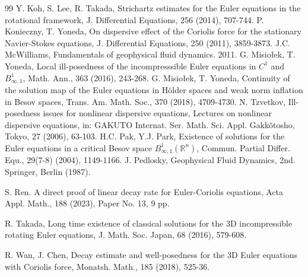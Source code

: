 \documentclass[12pt]{article}
\newcommand{\R}{\mathbb{R}}
\begin{document}
\begin{thebibliography}{99}
 Y. Koh, S. Lee, R. Takada, Strichartz estimates for the Euler equations in the rotational framework, J. Differential Equations, 256 (2014), 707-744.
 P. Konieczny, T. Yoneda, On dispersive effect of the Coriolis force for the stationary
Navier-Stokes equations, J. Differential Equations, 250 (2011), 3859-3873.
 J.C. McWilliams, Fundamentals of geophysical fluid dynamics. 2011.
 G. Misio{\l}ek, T. Yoneda, Local ill-posedness of the incompresssible Euler equations in $C^1$ and $B^1_{\infty,1}$, Math. Ann., 363 (2016), 243-268.
 G. Misio{\l}ek, T. Yoneda, Continuity of the solution map of the Euler equations in H\"{o}lder spaces and weak norm
inflation in Besov spaces, Trans. Am. Math. Soc., 370 (2018), 4709-4730.
 N. Tzvetkov, Ill-posedness issues for nonlinear dispersive equations, Lectures on nonlinear dispersive equations, in: GAKUTO Internat. Ser. Math. Sci. Appl. Gakk\~{o}tosho, Tokyo, 27 (2006), 63-103.
 H.C. Pak, Y.J. Park, Existence of solutions for the Euler equations in a critical Besov space $B^1_{\infty,1}(\R^n)$, Commun.
Partial Differ. Equ., 29(7-8) (2004), 1149-1166.
 J. Pedlosky, Geophysical Fluid Dynamics, 2nd. Springer, Berlin (1987).

 S. Ren. A direct proof of linear decay rate for Euler-Coriolis equations, Acta Appl. Math., 188 (2023), Paper No. 13, 9 pp.

 R. Takada, Long time existence of classical solutions for the 3D incompressible rotating Euler equations, J. Math. Soc. Japan, 68 (2016), 579-608.


 R. Wan, J. Chen, Decay estimate and well-posedness for the 3D Euler equations with Coriolis
force, Monatsh. Math., 185 (2018), 525-36.









\end{thebibliography}
\end{document}
